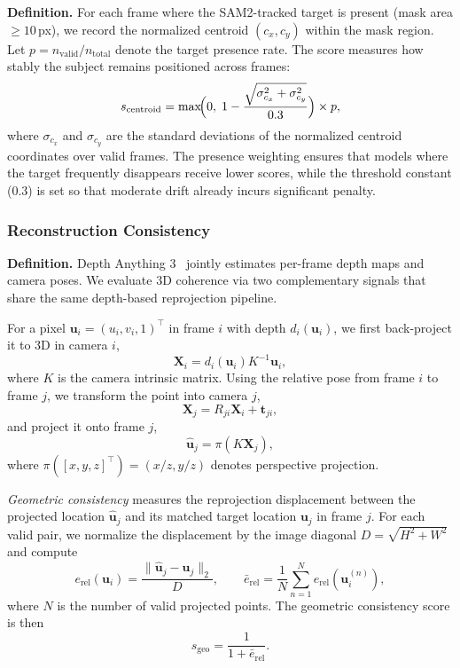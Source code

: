 \documentclass{llmxive}
\providecommand{\myparagraph}[1]{\vspace{-0.1em}\noindent\textbf{#1}\hspace{0.3em}}
\begin{document}
\myparagraph{Definition.}
For each frame where the SAM2-tracked target is present (mask area $\geq 10$\,px), we record the normalized centroid $(c_x, c_y)$ within the mask region.
Let $p = n_{\text{valid}} / n_{\text{total}}$ denote the target presence rate.
The score measures how stably the subject remains positioned across frames:
\begin{equation}
  s_{\text{centroid}} = \max\!\Bigl(0,\; 1 - \frac{\sqrt{\sigma_{c_x}^2 + \sigma_{c_y}^2}}{0.3}\Bigr) \times p,
\end{equation}
where $\sigma_{c_x}$ and $\sigma_{c_y}$ are the standard deviations of the normalized centroid coordinates over valid frames.
The presence weighting ensures that models where the target frequently disappears receive lower scores, while the threshold constant ($0.3$) is set so that moderate drift already incurs significant penalty.


\subsubsection{Reconstruction Consistency}
\label{app:reconstruction_detail}

\myparagraph{Definition.}
Depth Anything 3~\cite{lin2025depthanything3} jointly estimates per-frame depth maps and camera poses.
We evaluate 3D coherence via two complementary signals that share the same depth-based reprojection pipeline.

For a pixel $\mathbf{u}_i = (u_i, v_i, 1)^\top$ in frame $i$ with depth $d_i(\mathbf{u}_i)$, we first back-project it to 3D in camera $i$,
\begin{equation}
  \mathbf{X}_i = d_i(\mathbf{u}_i) K^{-1} \mathbf{u}_i,
\end{equation}
where $K$ is the camera intrinsic matrix.
Using the relative pose from frame $i$ to frame $j$, we transform the point into camera $j$,
\begin{equation}
  \mathbf{X}_j = R_{ji} \mathbf{X}_i + \mathbf{t}_{ji},
\end{equation}
and project it onto frame $j$,
\begin{equation}
  \hat{\mathbf{u}}_j = \pi(K \mathbf{X}_j),
\end{equation}
where $\pi([x, y, z]^\top) = (x/z, y/z)$ denotes perspective projection.

\emph{Geometric consistency} measures the reprojection displacement between the projected location $\hat{\mathbf{u}}_j$ and its matched target location $\mathbf{u}_j$ in frame $j$.
For each valid pair, we normalize the displacement by the image diagonal $D = \sqrt{H^2 + W^2}$ and compute
\begin{equation}
  e_{\mathrm{rel}}(\mathbf{u}_i) = \frac{\lVert \hat{\mathbf{u}}_j - \mathbf{u}_j \rVert_2}{D},
  \qquad
  \bar{e}_{\mathrm{rel}} = \frac{1}{N} \sum_{n=1}^{N} e_{\mathrm{rel}}(\mathbf{u}_i^{(n)}),
\end{equation}
where $N$ is the number of valid projected points.
The geometric consistency score is then
\begin{equation}
  s_{\mathrm{geo}} = \frac{1}{1 + \bar{e}_{\mathrm{rel}}}.
\end{equation}
\end{document}
